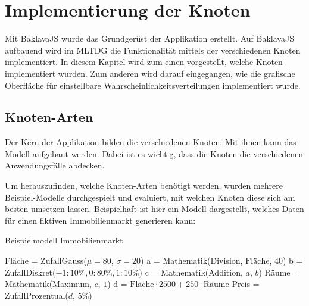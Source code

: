 
\chapter{Implementierung der Knoten}

Mit BaklavaJS wurde das Grundgerüst der Applikation erstellt. Auf BaklavaJS aufbauend wird im \ac{MLTDG} die Funktionalität mittels der verschiedenen Knoten implementiert. In diesem Kapitel wird zum einen vorgestellt, welche Knoten implementiert wurden. Zum anderen wird darauf eingegangen, wie die grafische Oberfläche für einstellbare Wahrscheinlichkeitsverteilungen implementiert wurde.

\section{Knoten-Arten}
Der Kern der Applikation bilden die verschiedenen Knoten: Mit ihnen kann das Modell aufgebaut werden. Dabei ist es wichtig, dass die Knoten die verschiedenen Anwendungsfälle abdecken.

Um herauszufinden, welche Knoten-Arten benötigt werden, wurden mehrere Beispiel-Modelle durchgespielt und evaluiert, mit welchen Knoten diese sich am besten umsetzen lassen. Beispielhaft ist hier ein Modell dargestellt, welches Daten für einen fiktiven Immobilienmarkt generieren kann:
\begin{algorithm}[H]
    \caption{Beispielmodell Immobilienmarkt}
    \begin{algorithmic}[1]
        \State Fläche = ZufallGauss($\mu = 80$, $\sigma = 20$)
        \State a = Mathematik(Division, $\textrm{Fläche}$, $40$)
        \State b = ZufallDiskret($-1: 10\%, 0: 80\%, 1: 10\%$)
        \State c = Mathematik(Addition, $a$, $b$)
        \State Räume = Mathematik(Maximum, $c$, $1$)
        \State d = $\textrm{Fläche} \cdot 2500 + 250 \cdot \textrm{Räume}$
        \State Preis = ZufallProzentual($d$, $5\%$)
    \end{algorithmic}
\end{algorithm}

